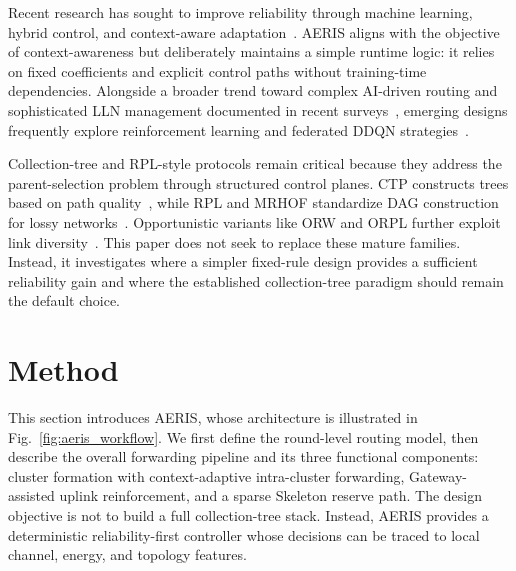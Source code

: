 \documentclass[conference]{IEEEtran}
\begin{document}
Recent research has sought to improve reliability through machine learning, hybrid control, and context-aware adaptation~\cite{kumar2019machine,hu2024security,pushpa2025optimizing,tossa2025wireless,wang2024energy,khedr2025advancing,almutairi2025secured}. AERIS aligns with the objective of context-awareness but deliberately maintains a simple runtime logic: it relies on fixed coefficients and explicit control paths without training-time dependencies. Alongside a broader trend toward complex AI-driven routing and sophisticated LLN management documented in recent surveys~\cite{almutairi2024survey,djennadi2025exploring,thakur2025ai}, emerging designs frequently explore reinforcement learning and federated DDQN strategies~\cite{ren2023mefi,okine2024multi,singh2025enhanced,bhukya2025hybrid}.

Collection-tree and RPL-style protocols remain critical because they address the parent-selection problem through structured control planes. CTP constructs trees based on path quality~\cite{gnawali2009collection}, while RPL and MRHOF standardize DAG construction for lossy networks~\cite{tsvetkov2011rpl,gnawali2012minimum}. Opportunistic variants like ORW and ORPL further exploit link diversity~\cite{landsiedel2012low,duquennoy2013let}. This paper does not seek to replace these mature families. Instead, it investigates where a simpler fixed-rule design provides a sufficient reliability gain and where the established collection-tree paradigm should remain the default choice.

\section{Method}
This section introduces AERIS, whose architecture is illustrated in Fig.~\ref{fig:aeris_workflow}. We first define the round-level routing model, then describe the overall forwarding pipeline and its three functional components: cluster formation with context-adaptive intra-cluster forwarding, Gateway-assisted uplink reinforcement, and a sparse Skeleton reserve path. The design objective is not to build a full collection-tree stack. Instead, AERIS provides a deterministic reliability-first controller whose decisions can be traced to local channel, energy, and topology features.
\end{document}
